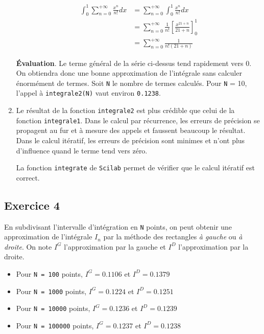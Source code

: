 \documentclass[a4paper,11pt]{article}
\theoremstyle{nonumberplain}
\theoremstyle{nonumberplain}
\theoremstyle{nonumberplain}
\begin{document}
\begin{enumerate}
        \begin{equation*}
        \begin{split}
            \int_{0}^{1}\sum\limits_{n = 0}^{+\infty} \frac{x^{n}}{n!} dx   & = \sum\limits_{n = 0}^{+\infty}\int_{0}^{1}\frac{x^{n}}{n!} dx \\
                                                                            & = \sum\limits_{n = 0}^{+\infty} \frac{1}{n!}\left[\frac{x^{21 + n}}{21 + n}\right]_{0}^{1} \\
                                                                            & = \sum\limits_{n = 0}^{+\infty} \frac{1}{n! (21+n)}
        \end{split}
        \end{equation*}

        \textbf{\'{E}valuation}. Le terme général de la série ci-dessus tend rapidement vers $0$.
        On obtiendra donc une bonne approximation de l'intégrale sans calculer énormément de termes.
        Soit \texttt{N} le nombre de termes calculés. Pour \texttt{N} = 10, l'appel à \texttt{integrale2(N)} vaut environ \texttt{0.1238}.

        \item
        Le résultat de la fonction \texttt{integrale2} est plus crédible que celui de la fonction \texttt{integrale1}.
        Dans le calcul par récurrence, les erreurs de précision se propagent au fur et à mesure des appels et faussent beaucoup le résultat.
        Dans le calcul itératif, les erreurs de précision sont minimes et n'ont plus d'influence quand le terme tend vers zéro.

        La fonction \texttt{integrate} de \texttt{Scilab} permet de vérifier que le calcul itératif est correct.
    \end{enumerate}


\subsection*{Exercice 4}

    En subdivisant l'intervalle d'intégration en \texttt{N} points, on peut obtenir une
    approximation de l'intégrale $I_{n}$ par la méthode des rectangles \textit{à gauche} ou \textit{à droite}.
    On note $I^{G}$ l'approximation par la gauche et $I^{D}$ l'approximation par la droite.

    \begin{itemize}
        \item
        Pour \texttt{N = 100} points, $I^{G} = 0.1106$ et $I^{D} = 0.1379$

        \item
        Pour \texttt{N = 1000} points, $I^{G} = 0.1224$ et $I^{D} = 0.1251$

        \item
        Pour \texttt{N = 10000} points, $I^{G} = 0.1236$ et $I^{D} = 0.1239$

        \item
        Pour \texttt{N = 100000} points, $I^{G} = 0.1237$ et $I^{D} = 0.1238$
    \end{itemize}
\end{document}
